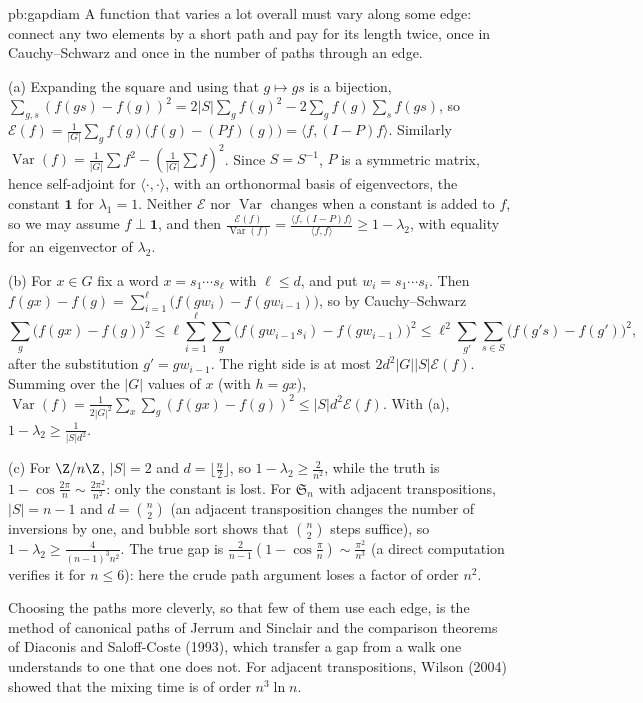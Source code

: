 \begin{solution}{pb:gapdiam}
\idea A function that varies a lot overall must vary along some edge: connect any two elements by a short path and pay for its
length twice, once in Cauchy--Schwarz and once in the number of paths through an edge.

\writeup (a) Expanding the square and using that $g\mapsto gs$ is a bijection,
$\sum_{g,s}(f(gs)-f(g))^2=2|S|\sum_gf(g)^2-2\sum_gf(g)\sum_sf(gs)$, so $\mathcal E(f)=\frac1{|G|}\sum_gf(g)\bigl(f(g)-(Pf)(g)\bigr)=\langle f,(I-P)f\rangle$. Similarly
$\operatorname{Var}(f)=\frac1{|G|}\sum f^2-(\frac1{|G|}\sum f)^2$. Since $S=S^{-1}$, $P$ is a symmetric matrix, hence self-adjoint for $\langle\cdot,\cdot\rangle$, with an orthonormal basis of eigenvectors, the
constant $\mathbf 1$ for $\lambda_1=1$. Neither $\mathcal E$ nor $\operatorname{Var}$ changes when a constant is added to $f$, so we may assume $f\perp\mathbf1$, and then $\frac{\mathcal E(f)}{\operatorname{Var}(f)}=\frac{\langle f,(I-P)f\rangle}{\langle f,f\rangle}\ge1-\lambda_2$,
with equality for an eigenvector of $\lambda_2$.

(b) For $x\in G$ fix a word $x=s_1\cdots s_\ell$ with $\ell\le d$, and put $w_i=s_1\cdots s_i$. Then $f(gx)-f(g)=\sum_{i=1}^\ell\bigl(f(gw_i)-f(gw_{i-1})\bigr)$, so by Cauchy--Schwarz
\[
\sum_g\bigl(f(gx)-f(g)\bigr)^2\le\ell\sum_{i=1}^\ell\sum_g\bigl(f(gw_{i-1}s_i)-f(gw_{i-1})\bigr)^2\le\ell^2\sum_{g'}\sum_{s\in S}\bigl(f(g's)-f(g')\bigr)^2,
\]
after the substitution $g'=gw_{i-1}$. The right side is at most $2d^2|G||S|\mathcal E(f)$. Summing over the $|G|$ values of $x$ (with $h=gx$),
$\operatorname{Var}(f)=\frac1{2|G|^2}\sum_x\sum_g(f(gx)-f(g))^2\le|S|d^2\mathcal E(f)$. With (a), $1-\lambda_2\ge\frac1{|S|d^2}$.

(c) For $\Z/n\Z$, $|S|=2$ and $d=\lfloor\frac n2\rfloor$, so $1-\lambda_2\ge\frac2{n^2}$, while the truth is $1-\cos\frac{2\pi}n\sim\frac{2\pi^2}{n^2}$: only the constant is lost. For $\mathfrak S_n$
with adjacent transpositions, $|S|=n-1$ and $d=\binom n2$ (an adjacent transposition changes the number of inversions by one, and bubble
sort shows that $\binom n2$ steps suffice), so $1-\lambda_2\ge\frac4{(n-1)^3n^2}$. The true gap is $\frac2{n-1}(1-\cos\frac\pi n)\sim\frac{\pi^2}{n^3}$ (a direct computation verifies it for $n\le6$): here the crude
path argument loses a factor of order $n^2$.

\leads Choosing the paths more cleverly, so that few of them use each edge, is the method of canonical paths of Jerrum and Sinclair and
the comparison theorems of Diaconis and Saloff-Coste (1993), which transfer a gap from a walk one understands to one that one
does not. For adjacent transpositions, Wilson (2004) showed that the mixing time is of order $n^3\ln n$.
\end{solution}

